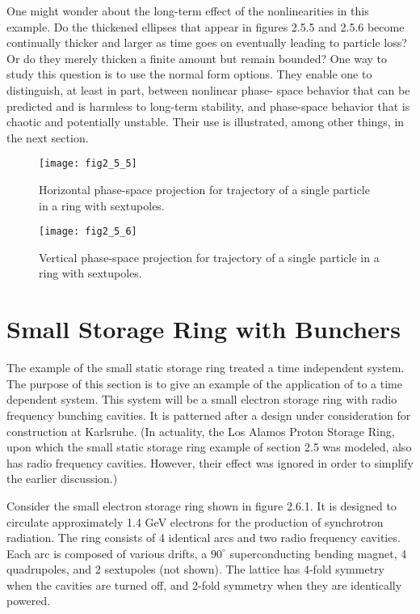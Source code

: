      One might wonder about the long-term effect of the nonlinearities in
this example.  Do the thickened ellipses that appear in figures 2.5.5 and
2.5.6
become continually thicker and larger as time goes on eventually leading to
particle loss?  Or do they merely thicken a finite amount but remain
bounded? One way to study this question is to use the \Mary normal form
options. They enable one to distinguish, at least in part, between
nonlinear phase- space behavior that can be predicted and is harmless to
long-term stability, and phase-space behavior that is chaotic and
potentially unstable.  Their use is illustrated, among other things, in the
next section.

\newpage
\begin{figure}[hp]
  \centering
  \texttt{[image: fig2\_5\_5]}
  \caption{Horizontal phase-space projection for
                  trajectory of a single particle in a ring
                              with sextupoles.}
\end{figure}

\begin{figure}[hp]
  \centering
  \texttt{[image: fig2\_5\_6]}
  \caption{Vertical phase-space projection for
                  trajectory of a single particle in a ring
                              with sextupoles.}
\end{figure}

\clearpage
\section{Small Storage Ring with Bunchers}
\label{ringbunchers}
     The example of the small static storage ring treated a time
independent system.  The purpose of this section is to give an example of
the application of \Mary to a time dependent system.  This system will be
a small electron storage ring with radio frequency bunching cavities.  It
is patterned after a design under consideration for construction at
Karlsruhe.  (In actuality, the Los Alamos Proton Storage Ring, upon which
the small static storage ring example of section 2.5 was modeled, also has radio frequency
cavities.  However, their effect was ignored in order to simplify the
earlier discussion.)

     Consider the small electron storage ring shown in figure 2.6.1.  It is
designed to circulate approximately 1.4 GeV electrons for the production of
synchrotron radiation.  The ring consists of 4 identical arcs and two radio
frequency cavities.  Each arc is composed of various drifts, a $90^{\circ}$
superconducting bending magnet, 4 quadrupoles, and 2 sextupoles (not
shown). The lattice has 4-fold symmetry when the cavities are turned off,
and 2-fold symmetry when they are identically powered.  


